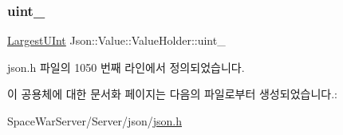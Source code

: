 \subsubsection{\texorpdfstring{uint\+\_\+}{uint\_}}
{\footnotesize\ttfamily \hyperlink{class_json_1_1_value_a6682a3684d635e03fc06ba229fa24eec}{Largest\+U\+Int} Json\+::\+Value\+::\+Value\+Holder\+::uint\+\_\+}



json.\+h 파일의 1050 번째 라인에서 정의되었습니다.



이 공용체에 대한 문서화 페이지는 다음의 파일로부터 생성되었습니다.\+:\begin{DoxyCompactItemize}
\item 
Space\+War\+Server/\+Server/json/\hyperlink{json_8h}{json.\+h}\end{DoxyCompactItemize}
